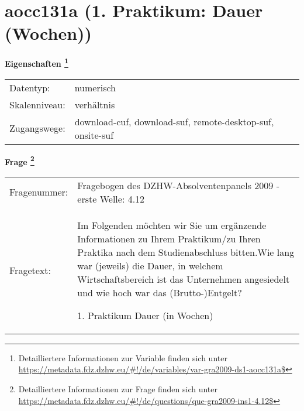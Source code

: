 
    \setcounter{footnote}{0}

    \vspace*{-1.8cm}
	\section{aocc131a (1. Praktikum: Dauer (Wochen))}
	\label{section:aocc131a}



    \vspace*{0.5cm}
    \noindent\textbf{Eigenschaften
	\footnote{Detailliertere Informationen zur Variable finden sich unter
		\url{https://metadata.fdz.dzhw.eu/\#!/de/variables/var-gra2009-ds1-aocc131a$}}}\\
	\begin{tabularx}{\hsize}{@{}lX}
	Datentyp: & numerisch \\
	Skalenniveau: & verhältnis \\
	Zugangswege: &
	  download-cuf, 
	  download-suf, 
	  remote-desktop-suf, 
	  onsite-suf
 \\
    \end{tabularx}



				\vspace*{0.5cm}
                \noindent\textbf{Frage
	                \footnote{Detailliertere Informationen zur Frage finden sich unter
		              \url{https://metadata.fdz.dzhw.eu/\#!/de/questions/que-gra2009-ins1-4.12$}}}\\
				\begin{tabularx}{\hsize}{@{}lX}
					Fragenummer: &
					  Fragebogen des DZHW-Absolventenpanels 2009 - erste Welle:
					  4.12
 \\
					Fragetext: & Im Folgenden möchten wir Sie um ergänzende Informationen zu Ihrem Praktikum/zu Ihren Praktika nach dem Studienabschluss bitten.Wie lang war (jeweils) die Dauer, in welchem Wirtschaftsbereich ist das Unternehmen angesiedelt und wie hoch war das (Brutto-)Entgelt?\par  1. Praktikum Dauer (in Wochen) \\
				\end{tabularx}





